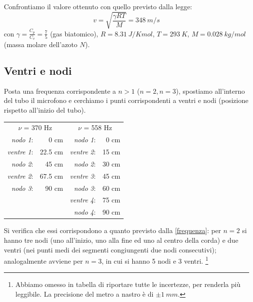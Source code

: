
Confrontiamo il valore ottenuto con quello previsto dalla legge:
\begin{equation}
v=\sqrt{\frac{\gamma R T}{M}} = 348\ m/s
\end{equation}
con $\gamma=\displaystyle{\frac{C_p}{C_v}}=\frac{7}{5}$ (gas biatomico), $R=8.31\ J/K mol$, $T=293\ K$, $M= 0.028\ kg/mol$ (massa molare dell'azoto $N$).


\subsection{Ventri e nodi}
Posta una frequenza corrispondente a $n>1$ ($n=2, n=3$), spostiamo all'interno del tubo il microfono e cerchiamo i punti corrispondenti a ventri e nodi (posizione rispetto all'inizio del tubo).

\begin{center}
\begin{tabular}{r r r r}

\multicolumn{2}{c}{$\nu$ = 370 Hz}& \multicolumn{2}{c}{$\nu$ = 558 Hz}\\
\textit{nodo 1}:& 0 cm & \hspace{2cm}\textit{nodo 1}:& 0 cm\\
\textit{ventre 1}:& 22.5 cm & \hspace{2cm}\textit{ventre 2}:& 15 cm\\
\textit{nodo 2}:& 45 cm &\hspace{2cm}\textit{nodo 2}:& 30 cm\\
\textit{ventre 2}:& 67.5 cm &\hspace{2cm}\textit{ventre 3}:& 45 cm\\
\textit{nodo 3}:& 90 cm &\hspace{2cm} \textit{nodo 3}:& 60 cm\\
& & \textit{ventre 4}:& 75 cm \\
& & \textit{nodo 4}:& 90 cm \\
\end{tabular}
\end{center}

Si verifica che essi corrispondono a quanto previsto dalla \ref{frequenza}: per $n=2$ si hanno tre nodi (uno all'inizio, uno alla fine ed uno al centro della corda) e due ventri (nei punti medi dei segmenti congiungenti due nodi consecutivi); analogalmente avviene per $n=3$, in cui si hanno 5 nodi e 3 ventri. \footnote{Abbiamo omesso in tabella di riportare tutte le incertezze, per renderla più leggibile. La precisione del metro a nastro è di $\pm1\ mm$.}

